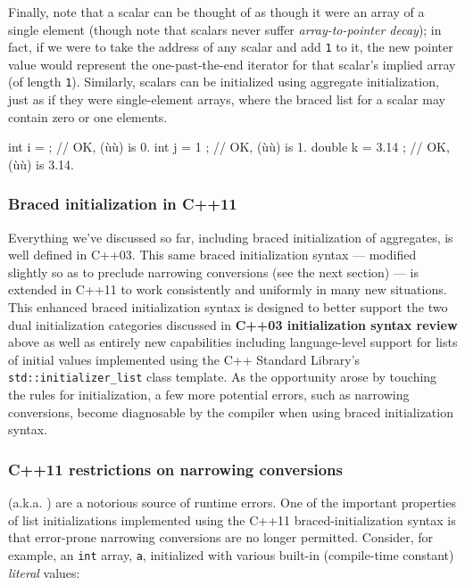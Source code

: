 Finally, note that a scalar can be thought of as though it were an array
of a single element (though note that scalars never suffer
\emph{array-to-pointer decay}); in fact, if we were to take the address
of any scalar and add \lstinline!1! to it, the new pointer value would
represent the one-past-the-end iterator for that scalar's implied array
(of length \lstinline!1!). Similarly, scalars can be initialized using
aggregate initialization, just as if they were single-element arrays,
where the braced list for a scalar may contain zero or one elements.

\begin{emcppslisting}
int    i = { };       // OK, (ù{}ù) is 0.
int    j = { 1 };     // OK, (ù{}ù) is 1.
double k = { 3.14 };  // OK, (ù{}ù) is 3.14.
\end{emcppslisting}


\subsubsection[Braced initialization in C++11]{Braced initialization in C++11}\label{braced-initialization-in-c++11}

Everything we've discussed so far, including braced initialization of
aggregates, is well defined in C++03. This same braced initialization
syntax --- modified slightly so as to preclude narrowing conversions
(see the next section) --- is extended in C++11 to work consistently and
uniformly in many new situations. This enhanced braced initialization
syntax is designed to better support the two dual initialization
categories discussed in \textbf{C++03 initialization syntax review}%
 above
as well as entirely new capabilities including language-level support
for lists of initial values implemented using the C++ Standard Library's
\lstinline!std::initializer_list! class template. As the opportunity arose
by touching the rules for initialization, a few more potential errors,
such as narrowing conversions, become diagnosable by the compiler when
using braced initialization syntax.

\subsubsection[C++11 restrictions on narrowing conversions]{C++11 restrictions on narrowing conversions}\label{c++11-restrictions-on-narrowing-conversions}

 (a.k.a. ) are a
notorious source of runtime errors. One of the important properties of
list initializations implemented using the C++11 braced-initialization
syntax is that error-prone narrowing conversions are no longer
permitted. Consider, for example, an \lstinline!int! array, \lstinline!a!,
initialized with various built-in (compile-time constant) \emph{literal}
values:

